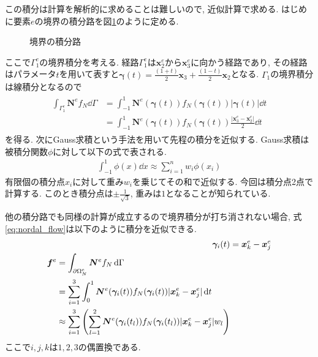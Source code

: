 \documentclass{ltjsarticle}
\begin{document}
この積分は計算を解析的に求めることは難しいので, 近似計算で求める.
はじめに要素$e$の境界の積分路を図\ref{fig:element_edges}のように定める.
\begin{figure}[htbp]
    \centering
  \caption{境界の積分路}
  \label{fig:element_edges}
\end{figure}
ここで$\Gamma^e_1$の境界積分を考える.
経路$\Gamma^e_1$は$\bm{x}^e_2$から$\bm{x}^e_3$に向かう経路であり,
その経路はパラメータ$t$を用いて表すと$\bm{\gamma}(t) = \frac{(1+t)}{2}\bm{x}_3 + \frac{(1-t)}{2}\bm{x}_2$となる.
$\Gamma_1$の境界積分は線積分となるので
\begin{align}
    \begin{split}
        \int_{\Gamma^e_1}\bm{N}^e f_N\dd{\Gamma}
        &= \int_{-1}^1 \bm{N}^e(\bm{\gamma}(t))f_N(\bm{\gamma}(t))|\bm{\gamma}(t)|\dd{t} \\
        &= \int_{-1}^1 \bm{N}^e(\bm{\gamma}(t))f_N(\bm{\gamma}(t))\frac{|\bm{x}^e_3-\bm{x}^e_2|}{2}\dd{t}
    \end{split}
\end{align}
を得る.
次にGauss求積という手法を用いて先程の積分を近似する.
Gauss求積は被積分関数$\phi$に対して以下の式で表される.
\begin{align}
    \int_{-1}^1\phi(x)\dd{x}\approx\sum_{i=1}^n w_i\phi(x_i)
\end{align}
有限個の積分点$x_i$に対して重み$w_i$を乗じてその和で近似する.
今回は積分点2点で計算する.
このとき積分点は$\pm\frac{1}{\sqrt{3}}$, 重みは$1$となることが知られている.

他の積分路でも同様の計算が成立するので境界積分が打ち消されない場合,
式\eqref{eq:nordal_flow}は以下のように積分を近似できる.
\begin{align}
    \bm{\gamma}_i(t) &= \bm{x}^e_k-\bm{x}^e_j \\
    \begin{split}
        \bm{f}^e &=\int_{\partial\Omega^e_N}\bm{N}^e f_N\dd{\Gamma} \\
        &= \sum_{i=1}^3 \int_{0}^1 \bm{N}^e(\bm{\gamma}_i(t))f_N(\bm{\gamma}_i(t))|\bm{x}^e_k-\bm{x}^e_j|\dd{t} \\
        &\approx\sum_{i=1}^3\qty(\sum_{l=1}^2\bm{N}^e(\bm{\gamma}_i(t_l))f_N(\bm{\gamma}_i(t_l))|\bm{x}^e_k-\bm{x}^e_j|w_l)
    \end{split}
\end{align}
ここで$i,j,k$は$1,2,3$の偶置換である.
\end{document}
